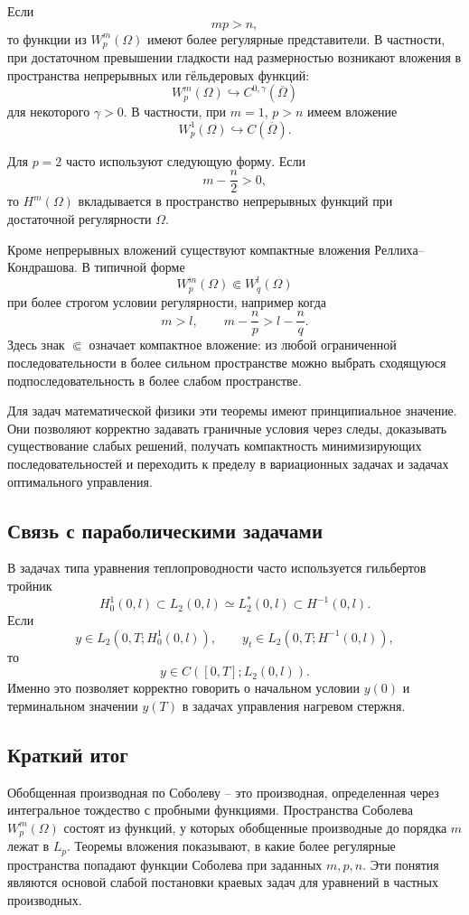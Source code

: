 \documentclass[12pt,a4paper]{article}
\begin{document}
Если
\[
mp>n,
\]
то функции из \(W_p^m(\Omega)\) имеют более регулярные представители. В частности, при достаточном превышении гладкости над размерностью возникают вложения в пространства непрерывных или гёльдеровых функций:
\[
W_p^m(\Omega)\hookrightarrow C^{0,\gamma}(\overline\Omega)
\]
для некоторого \(\gamma>0\). В частности, при \(m=1\), \(p>n\) имеем вложение
\[
W_p^1(\Omega)\hookrightarrow C(\overline\Omega).
\]

Для \(p=2\) часто используют следующую форму. Если
\[
m-\frac n2>0,
\]
то \(H^m(\Omega)\) вкладывается в пространство непрерывных функций при достаточной регулярности \(\Omega\).

Кроме непрерывных вложений существуют компактные вложения Реллиха--Кондрашова. В типичной форме
\[
W_p^m(\Omega)\Subset W_q^l(\Omega)
\]
при более строгом условии регулярности, например когда
\[
m>l,
\qquad
m-\frac np>l-\frac nq.
\]
Здесь знак \(\Subset\) означает компактное вложение: из любой ограниченной последовательности в более сильном пространстве можно выбрать сходящуюся подпоследовательность в более слабом пространстве.

Для задач математической физики эти теоремы имеют принципиальное значение. Они позволяют корректно задавать граничные условия через следы, доказывать существование слабых решений, получать компактность минимизирующих последовательностей и переходить к пределу в вариационных задачах и задачах оптимального управления.

\subsection*{Связь с параболическими задачами}
В задачах типа уравнения теплопроводности часто используется гильбертов тройник
\[
H_0^1(0,l)\subset L_2(0,l)\simeq L_2^*(0,l)\subset H^{-1}(0,l).
\]
Если
\[
y\in L_2(0,T;H_0^1(0,l)),
\qquad
y_t\in L_2(0,T;H^{-1}(0,l)),
\]
то
\[
y\in C([0,T];L_2(0,l)).
\]
Именно это позволяет корректно говорить о начальном условии \(y(0)\) и терминальном значении \(y(T)\) в задачах управления нагревом стержня.

\subsection*{Краткий итог}
Обобщенная производная по Соболеву -- это производная, определенная через интегральное тождество с пробными функциями. Пространства Соболева \(W_p^m(\Omega)\) состоят из функций, у которых обобщенные производные до порядка \(m\) лежат в \(L_p\). Теоремы вложения показывают, в какие более регулярные пространства попадают функции Соболева при заданных \(m,p,n\). Эти понятия являются основой слабой постановки краевых задач для уравнений в частных производных.
\end{document}
